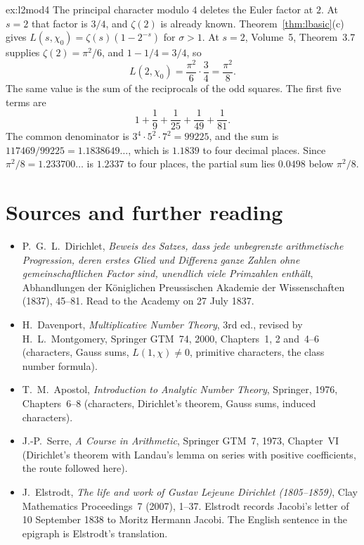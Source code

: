 \begin{solution}{ex:l2mod4}
\idea The principal character modulo $4$ deletes the Euler factor at $2$. At $s=2$ that factor is $3/4$, and $\zeta(2)$ is already known.
\writeup Theorem~\ref{thm:lbasic}(c) gives $L(s,\chi_0)=\zeta(s)(1-2^{-s})$ for $\sigma>1$. At $s=2$, Volume~5, Theorem~3.7 supplies $\zeta(2)=\pi^2/6$, and $1-1/4=3/4$, so
\[
L(2,\chi_0)=\frac{\pi^2}6\cdot\frac34=\frac{\pi^2}8.
\]
The same value is the sum of the reciprocals of the odd squares. The first five terms are
\[
1+\frac19+\frac1{25}+\frac1{49}+\frac1{81}.
\]
The common denominator is $3^4\cdot5^2\cdot7^2=99225$, and the sum is $117469/99225=1.1838649\ldots$, which is $1.1839$ to four decimal places. Since $\pi^2/8=1.233700\ldots$ is $1.2337$ to four places, the partial sum lies $0.0498$ below $\pi^2/8$.
\end{solution}

\section*{Sources and further reading}

\begin{itemize}
\item P.~G.~L.~Dirichlet, \emph{Beweis des Satzes, dass jede unbegrenzte arithmetische Progression, deren erstes Glied und Differenz ganze
Zahlen ohne gemeinschaftlichen Factor sind, unendlich viele Primzahlen enthält}, Abhandlungen der Königlichen Preussischen Akademie
der Wissenschaften (1837), 45--81. Read to the Academy on 27 July 1837.
\item H.~Davenport, \emph{Multiplicative Number Theory}, 3rd ed., revised by H.~L.~Montgomery, Springer GTM~74, 2000, Chapters~1, 2 and~4--6
(characters, Gauss sums, $L(1,\chi)\ne0$, primitive characters, the class number formula).
\item T.~M.~Apostol, \emph{Introduction to Analytic Number Theory}, Springer, 1976, Chapters~6--8 (characters, Dirichlet's theorem, Gauss sums, induced
characters).
\item J.-P.~Serre, \emph{A Course in Arithmetic}, Springer GTM~7, 1973, Chapter~VI (Dirichlet's theorem with Landau's lemma on series with
positive coefficients, the route followed here).
\item J.~Elstrodt, \emph{The life and work of Gustav Lejeune Dirichlet (1805--1859)}, Clay Mathematics Proceedings~7 (2007), 1--37. Elstrodt
records Jacobi's letter of 10 September 1838 to Moritz Hermann Jacobi. The English sentence in the epigraph is Elstrodt's translation.
\end{itemize}
